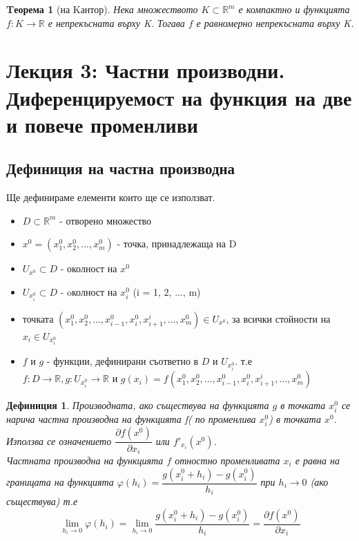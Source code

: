 \documentclass[a4paper,fleqn,12pt]{article}
\newtheorem{theorem}{Tеорема}[subsection]
\newtheorem{definition}{Дефиниция}[subsection]
\theoremstyle{definition}
\begin{document}
\begin{theorem}[на Kантор]
Нека множеството $K \subset \mathbb{R}^m$ е компактно и функцията $f: K \to \mathbb{R}$ е непрекъсната върху K. Тогава $f$ е равномерно непрекъсната върху K.
\end{theorem}


\newpage

\section{Лекция 3: Частни производни. Диференцируемост на функция на две и повече променливи}
 
\subsection{Дефиниция на частна производна}
Ще дефинираме елементи които ще се използват. 
\begin{itemize}
	\item $D \subset \mathbb{R}^m$ -  отворено множество
	\item $x^0 = (x_1 ^ 0, x_2 ^ 0, ... , x_m ^ 0)$ - точка, принадлежаща на D
	\item $U_{x^0} \subset D$ - околност на $x^0$
	\item $U_{x_i ^ 0} \subset D$ - oколност на $x_i ^ 0$ (i  = 1, 2, ..., m)
	\item точката $(x_1 ^ 0, x_2 ^ 0, ..., x_{i-1}^0, x_i ^ 0, x_{i+1} ^i, ..., x_m ^ 0) \in U_{x^0}$, за всички стойности на $x_i \in U_{x_i ^ 0}$
	\item $f$ и $g$ - функции, дефинирани съответно в $D$ и $U_{x_i ^ 0}$. т.е \\
$f: D \to \mathbb{R} , g: U_{x_i ^ 0} \to \mathbb{R}$ и $g(x_i) = f(x_1 ^ 0, x_2 ^ 0, ..., x_{i-1}^0, x_i ^ 0, x_{i+1} ^i, ..., x_m ^ 0)$
\end{itemize}
 
\begin{definition}
Производната, ако съществува на функцията $g$ в точката $x_i ^ 0$ се нарича частна производна на функцията f( по променлива  $x_i ^ 0$) в точката $x^0$. Използва се означението $\dfrac {\partial f(x^0)}{\partial x_i}$ или $f'_{x_i} (x^0)$. \\
Частната производна на функцията $f$ отностно променливата $x_i$ е равна на границата на функцията $\varphi (h_i)  = \dfrac{g(x_i ^0 + h_i) - g(x_i ^ 0)}{h_i}$ при $h_i \to 0$ (ако съществува) т.е
$$\lim_{h_i \to 0} \varphi (h_i) = \lim_{h_i \to 0} \dfrac{g(x_i ^0 + h_i) - g(x_i ^ 0)}{h_i} = \dfrac {\partial f(x^0)}{\partial x_i}$$
\end{definition}
\end{document}
